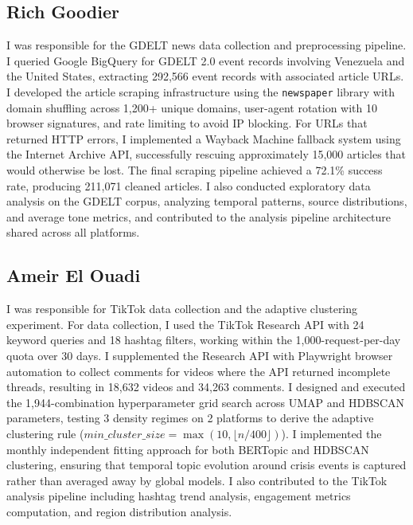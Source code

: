 \documentclass[12pt, letterpaper]{article}
\begin{document}
\subsection*{Rich Goodier}
I was responsible for the GDELT news data collection and preprocessing pipeline. I queried Google BigQuery for GDELT 2.0 event records involving Venezuela and the United States, extracting 292,566 event records with associated article URLs. I developed the article scraping infrastructure using the \texttt{newspaper} library with domain shuffling across 1,200+ unique domains, user-agent rotation with 10 browser signatures, and rate limiting to avoid IP blocking. For URLs that returned HTTP errors, I implemented a Wayback Machine fallback system using the Internet Archive API, successfully rescuing approximately 15,000 articles that would otherwise be lost. The final scraping pipeline achieved a 72.1\% success rate, producing 211,071 cleaned articles. I also conducted exploratory data analysis on the GDELT corpus, analyzing temporal patterns, source distributions, and average tone metrics, and contributed to the analysis pipeline architecture shared across all platforms.

\subsection*{Ameir El Ouadi}
I was responsible for TikTok data collection and the adaptive clustering experiment. For data collection, I used the TikTok Research API with 24 keyword queries and 18 hashtag filters, working within the 1,000-request-per-day quota over 30 days. I supplemented the Research API with Playwright browser automation to collect comments for videos where the API returned incomplete threads, resulting in 18,632 videos and 34,263 comments. I designed and executed the 1,944-combination hyperparameter grid search across UMAP and HDBSCAN parameters, testing 3 density regimes on 2 platforms to derive the adaptive clustering rule ($min\_cluster\_size = \max(10, \lfloor n/400 \rfloor)$). I implemented the monthly independent fitting approach for both BERTopic and HDBSCAN clustering, ensuring that temporal topic evolution around crisis events is captured rather than averaged away by global models. I also contributed to the TikTok analysis pipeline including hashtag trend analysis, engagement metrics computation, and region distribution analysis.
\end{document}
